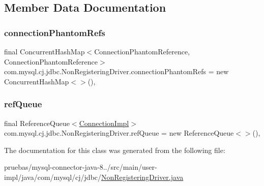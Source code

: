 \subsection{Member Data Documentation}
\mbox{\label{classcom_1_1mysql_1_1cj_1_1jdbc_1_1_non_registering_driver_a3c1f45389d1b114801ab9a0054a72a56}} 
\subsubsection{\texorpdfstring{connection\+Phantom\+Refs}{connectionPhantomRefs}}
{\footnotesize\ttfamily final Concurrent\+Hash\+Map$<$Connection\+Phantom\+Reference, Connection\+Phantom\+Reference$>$ com.\+mysql.\+cj.\+jdbc.\+Non\+Registering\+Driver.\+connection\+Phantom\+Refs = new Concurrent\+Hash\+Map$<$$>$()\hspace{0.3cm}{\ttfamily [static]}, {\ttfamily [protected]}}

\mbox{\label{classcom_1_1mysql_1_1cj_1_1jdbc_1_1_non_registering_driver_aad570b2f650c5e4f22c47374bd2f8b6c}} 
\subsubsection{\texorpdfstring{ref\+Queue}{refQueue}}
{\footnotesize\ttfamily final Reference\+Queue$<$\mbox{\hyperlink{classcom_1_1mysql_1_1cj_1_1jdbc_1_1_connection_impl}{Connection\+Impl}}$>$ com.\+mysql.\+cj.\+jdbc.\+Non\+Registering\+Driver.\+ref\+Queue = new Reference\+Queue$<$$>$()\hspace{0.3cm}{\ttfamily [static]}, {\ttfamily [protected]}}



The documentation for this class was generated from the following file\+:\begin{DoxyCompactItemize}
\item 
pruebas/mysql-\/connector-\/java-\/8../src/main/user-\/impl/java/com/mysql/cj/jdbc/\mbox{\hyperlink{_non_registering_driver_8java}{Non\+Registering\+Driver.\+java}}\end{DoxyCompactItemize}
